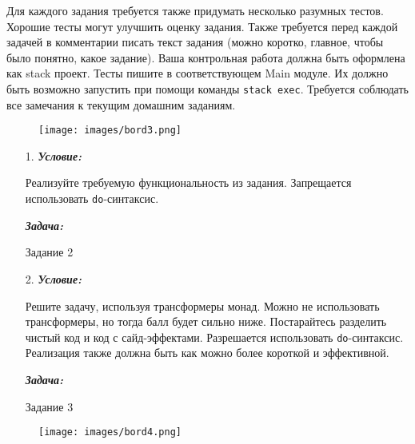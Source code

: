 \documentclass[11pt,a4paper]{article}
\begin{document}
Для каждого задания требуется также придумать несколько разумных тестов. Хорошие тесты могут улучшить оценку задания. Также требуется перед каждой задачей в комментарии писать текст задания (можно коротко, главное, чтобы было понятно, какое задание). Ваша контрольная работа должна быть оформлена как stack проект. Тесты пишите в соответствующем Main модуле. Их должно быть возможно запустить при помощи команды \texttt{stack exec}. Требуется соблюдать все замечания к текущим домашним заданиям.

\begin{figure}[H]
  \centering
  \texttt{[image: images/bord3.png]}
\end{figure}

\begin{enumerate}
  \item[1.]
  \textbf{\textit{Условие:}}

Реализуйте требуемую функциональность из задания. Запрещается использовать \texttt{do}-синтаксис.

  \textbf{\textit{Задача:}}

Задание 2
  \item[2.]
  \textbf{\textit{Условие:}}

Решите задачу, используя трансформеры монад. Можно не использовать трансформеры, но тогда балл будет сильно ниже. Постарайтесь разделить чистый код и код с сайд-эффектами. Разрешается использовать \texttt{do}-синтаксис. Реализация также должна быть как можно более короткой и эффективной.

  \textbf{\textit{Задача:}}

Задание 3
\end{enumerate}

\begin{figure}[H]
  \centering
  \texttt{[image: images/bord4.png]}
\end{figure}

\pagebreak
\end{document}
